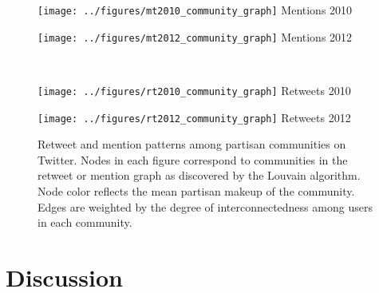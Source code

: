 \documentclass{acm_proc_article-sp}
\begin{document}
\begin{figure*}[ht]
  \centering
  \begin{minipage}[h]{0.45\linewidth}
    \begin{center}
      \texttt{[image: ../figures/mt2010\_community\_graph]}
      Mentions 2010
    \end{center}

  \end{minipage}
  \begin{minipage}[h]{0.45\linewidth}
    \begin{center}
      \texttt{[image: ../figures/mt2012\_community\_graph]}
      Mentions 2012
    \end{center}
  \end{minipage}\\
  \begin{minipage}[h]{0.45\linewidth}
    \begin{center}
      \texttt{[image: ../figures/rt2010\_community\_graph]}
      Retweets 2010
    \end{center}
  \end{minipage}
  \begin{minipage}[h]{0.45\linewidth}
    \begin{center}
      \texttt{[image: ../figures/rt2012\_community\_graph]}
      Retweets 2012
    \end{center}
  \end{minipage}
\caption{Retweet and mention patterns among partisan communities on
  Twitter. Nodes in each figure correspond to communities in the
  retweet or mention graph as discovered by the Louvain
  algorithm. Node color reflects the mean partisan makeup of the
  community. Edges are weighted by the degree of interconnectedness
  among users in each community.}
\label{}
\end{figure*}

\section{Discussion}
\label{sec:discussion}
\end{document}
